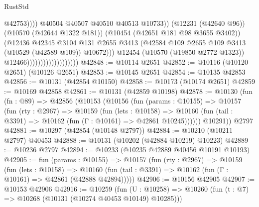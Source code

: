 \begin{lexlean}{RustStd}
\begin{coremodule}
                                                        @42753))))
                                                @40504
                                                @40507
                                                @40510
                                                @40513
                                                @10733))
                                            (@12231 (@42640 @96))
                                            (@10570 (@42644 @1322 @181))
                                            (@10454 (@42651 @181 @98 @3655 @3402))
                                            (@12436
                                              @42345
                                              @3104
                                              @131
                                              @2655
                                              @3413
                                              (@42584
                                                @109
                                                @2655
                                                @109
                                                @3413
                                                (@10529 (@42589 @109))
                                                @10672)))
                                          @12454
                                          (@10570 (@19850 @2772 @1323))
                                          @12466)))))))))))))))))))
@42848 := @10114 @2651
@42852 := @10116 (@10120 @2651) (@10126 @2651)
@42853 := @10145 @2651
@42854 := @10135 @42853
@42856 := @10131 (@42854 @10150)
@42858 := @10173 (@10174 @2651)
@42859 := @10169 @42858
@42861 := @10131 (@42859 @10198)
@42878 := @10130
    (fun (fn : @89) =>
    @42856
      (@10153
        (@10156
          (fun (params : @10155) =>
          @10157
            (fun (rty : @2967) =>
            @10159
              (fun (lets : @10158) =>
              @10160 (fun (tail : @3391) => @10162 (fun (Γ : @10161) => @42861 @10245))))))
        @10291))
    @2797
@42881 := @10297 (@42854 (@10148 @2797))
@42884 := @10210 (@10211 @2797) @40453
@42888 := @10131 (@10202 (@42884 @10219) @10223)
@42889 := @10236 @2797
@42894 := @10233 (@10235 @42889 @40456 @10191 @10193)
@42905 := fun (params : @10155) =>
  @10157
    (fun (rty : @2967) =>
    @10159
      (fun (lets : @10158) =>
      @10160 (fun (tail : @3391) => @10162 (fun (Γ : @10161) => @42861 (@42888 @42894)))))
@42906 := @10156 @42905
@42907 := @10153 @42906
@42916 := @10259
    (fun (U : @10258) => @10260 (fun (t : @7) => @10268 (@10131 (@10274 @40453 @10149) @10285)))

\end{coremodule}
\end{lexlean}
